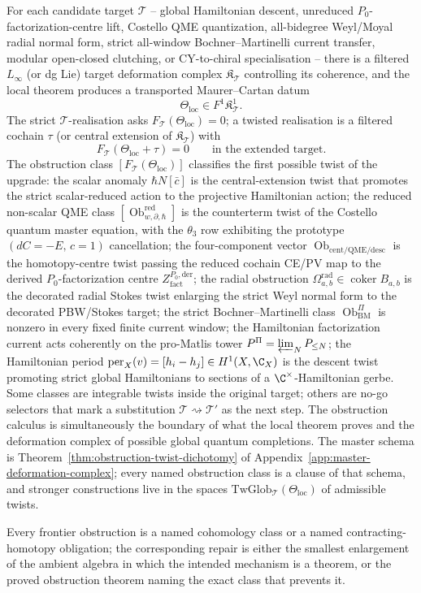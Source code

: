 For each candidate target \(\mathcal T\) -- global Hamiltonian descent,
unreduced \(P_0\)-factorization-centre lift, Costello QME quantization,
all-bidegree Weyl/Moyal radial normal form, strict all-window
Bochner--Martinelli current transfer, modular open-closed clutching,
or CY-to-chiral specialisation -- there is a filtered \(L_\infty\) (or
dg Lie) target deformation complex \(\mathfrak K_{\mathcal T}\)
controlling its coherence, and the local theorem produces a
transported Maurer--Cartan datum
\[
  \Theta_{\mathrm{loc}}\in F^1\mathfrak K^1_{\mathcal T} .
\]
The strict \(\mathcal T\)-realisation asks
\(F_{\mathcal T}(\Theta_{\mathrm{loc}})=0\); a twisted realisation is a
filtered cochain \(\tau\) (or central extension of
\(\mathfrak K_{\mathcal T}\)) with
\[
  F_{\mathcal T}(\Theta_{\mathrm{loc}}+\tau)=0
  \qquad\text{in the extended target.}
\]
The obstruction class \([F_{\mathcal T}(\Theta_{\mathrm{loc}})]\)
classifies the first possible twist of the upgrade: the scalar anomaly
\(\hbar N[\bar c]\) is the central-extension twist that promotes the
strict scalar-reduced action to the projective Hamiltonian action; the
reduced non-scalar QME class
\([\operatorname{Ob}^{\mathrm{red}}_{w,\partial,\hbar}]\) is the
counterterm twist of the Costello quantum master equation, with the
\(\theta_3\) row exhibiting the prototype
\((dC=-E,\,c=1)\) cancellation; the four-component vector
\(\operatorname{Ob}_{\mathrm{cent/QME/desc}}\) is the homotopy-centre
twist passing the reduced cochain CE/PV map to the derived
\(P_0\)-factorization centre \(Z^{P_0,\mathrm{der}}_{\mathrm{fact}}\);
the radial obstruction
\(\Omega^{\mathrm{rad}}_{a,b}\in\operatorname{coker}B_{a,b}\) is the
decorated radial Stokes twist enlarging the strict Weyl normal form
to the decorated PBW/Stokes target; the strict Bochner--Martinelli
class \(\operatorname{Ob}^{\Pi}_{\mathrm{BM}}\) is nonzero in every
fixed finite current window; the Hamiltonian factorization current
acts coherently on the pro-Matlis tower
\(P^\Pi=\varprojlim_N P_{\le N}\);
the Hamiltonian period \(\mathrm{per}_X(v)=[h_i-h_j]\in H^1(X,\C_X)\)
is the descent twist promoting strict global Hamiltonians to sections
of a \(\C^\times\)-Hamiltonian gerbe.  Some classes are integrable
twists inside the original target; others are no-go selectors that
mark a substitution \(\mathcal T\rightsquigarrow\mathcal T'\) as
the next step.  The obstruction calculus is simultaneously the
boundary of what the local theorem proves and the deformation complex
of possible global quantum completions.  The master schema is
Theorem~\ref{thm:obstruction-twist-dichotomy} of
Appendix~\ref{app:master-deformation-complex}; every named obstruction
class is a clause of that schema, and stronger constructions live in
the spaces \(\mathrm{TwGlob}_{\mathcal T}(\Theta_{\mathrm{loc}})\) of
admissible twists.

Every frontier obstruction is a named cohomology class or a named
contracting-homotopy obligation; the corresponding repair is either
the smallest enlargement of the ambient algebra in which the intended
mechanism is a theorem, or the proved obstruction theorem naming the
exact class that prevents it.

